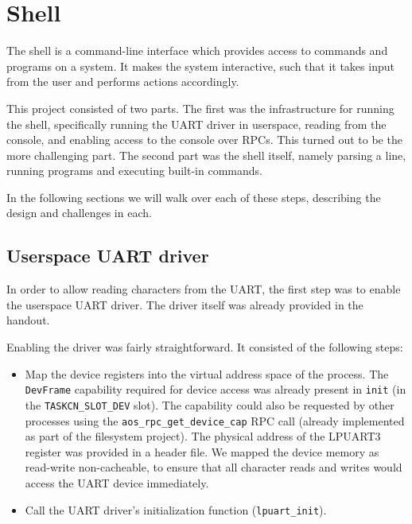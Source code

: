 \chapter{Shell}

The shell is a command-line interface which provides access to commands and programs on a system.
It makes the system interactive, such that it takes input from the user and performs actions accordingly.

This project consisted of two parts.
The first was the infrastructure for running the shell, specifically running the UART driver in userspace, reading from the console, and enabling access to the console over RPCs.
This turned out to be the more challenging part.
The second part was the shell itself, namely parsing a line, running programs and executing built-in commands.

In the following sections we will walk over each of these steps, describing the design and challenges in each.


\section{Userspace UART driver}

In order to allow reading characters from the UART, the first step was to enable the userspace UART driver.
The driver itself was already provided in the handout.

Enabling the driver was fairly straightforward. It consisted of the following steps:
\begin{itemize}

    \item
        Map the device registers into the virtual address space of the process.
        The \verb|DevFrame| capability required for device access was already present in \verb|init| (in the \verb|TASKCN_SLOT_DEV| slot).
        The capability could also be requested by other processes using the \verb|aos_rpc_get_device_cap| RPC call (already implemented as part of the filesystem project).
        The physical address of the LPUART3 register was provided in a header file.
        We mapped the device memory as read-write non-cacheable, to ensure that all character reads and writes would access the UART device immediately.

    \item
        Call the UART driver's initialization function (\verb|lpuart_init|).

\end{itemize}


